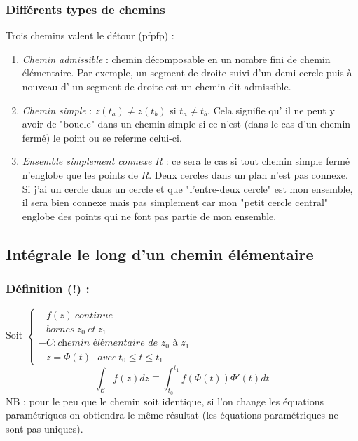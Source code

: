         \subsubsection{Différents types de chemins}
        Trois chemins valent le détour (pfpfp) :
        \begin{enumerate}
        \item \textit{Chemin admissible} : chemin décomposable en un nombre fini de chemin
        élémentaire. Par exemple, un segment de droite suivi d'un demi-cercle puis à nouveau d'
        un segment de droite est un chemin dit admissible.
        \item \textit{Chemin simple} : $z(t_a) \neq z(t_b)$ si $t_a \neq t_b$. Cela signifie qu'
        il ne peut y avoir de "boucle" dans un chemin simple si ce n'est (dans le cas d'un chemin
        fermé) le point ou se referme celui-ci.
        \item \textit{Ensemble simplement connexe $R$} : ce sera le cas si tout chemin simple fermé
        n'englobe que les points de $R$. Deux cercles dans un plan n'est pas connexe. Si j'ai un
        cercle dans un cercle et que "l'entre-deux cercle" est mon ensemble, il sera bien connexe
        mais pas simplement car mon "petit cercle central" englobe des points qui ne font pas partie
        de mon ensemble.
        \end{enumerate}
    
    \subsection{Intégrale le long d'un chemin élémentaire}
    \subsubsection{Définition (!) :}
    Soit $\left\{\begin{array}{l}
    - f(z)\ continue\\
    - bornes\ z_0\ et\ z_1\\
    - C : \textit{chemin élémentaire de $z_0$ à $z_1$}\\
    - z = \Phi(t)\ \ \ avec\ t_0 \leq t \leq t_1
    \end{array}\right.$ 
    \begin{equation}
    \int_\mathcal{C} f(z) dz \equiv \int_{t_0}^{t_1} f(\Phi(t))\Phi'(t) dt
    \end{equation}
    NB : pour le peu que le chemin soit identique, si l'on change les équations paramétriques on 
    obtiendra le même résultat (les équations paramétriques ne sont pas uniques).\\
    
